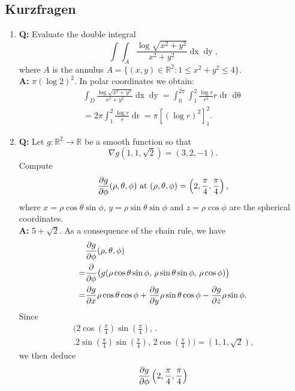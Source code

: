 \documentclass[a4paper,10pt]{article}
\def\R{\mathbb{R}}
\begin{document}
\subsection{Kurzfragen}
\begin{enumerate}
    \item \textbf{Q: } Evaluate the double integral
    \[\int \int_A \frac{\log \sqrt{x^2 + y^2}}{x^2 + y^2} \mathop{dx} \mathop{dy} \text{,}\]
    where $A$ is the annulus $A = \{(x, y) \in \R^2: 1 \le x^2 + y^2 \le 4\}$.\\
    \textbf{A:} $\pi (\log 2)^2$. In polar coordinates we obtain:
    \begin{multline*}
        \int_D \frac{\log \sqrt{x^2 + y^2}}{x^2 + y^2} \mathop{dx} \mathop{dy} = \int_0^{2 \pi} \int_1^2 \frac{\log r}{r^2} r \mathop{dr} \mathop{d \theta}\\
        = 2 \pi \int_1^2 \frac{\log r}{r} \mathop{dr} = \pi \left[(\log r)^2\right]_1^2 \text{.}
    \end{multline*}
    \item \textbf{Q:} Let $g: \R^2 \to \R$ be a smooth function so that
    \[\nabla g(1, 1, \sqrt{2}) = (3, 2, -1) \text{.}\]
    Compute
    \[\pdv{g}{\phi} (\rho, \theta, \phi) \text{ at } (\rho, \theta, \phi) = \left(2, \frac{\pi}{4}, \frac{\pi}{4}\right) \text{,}\]
    where $x = \rho \cos \theta \sin \phi$, $y = \rho \sin \theta \sin \phi$ and $z = \rho \cos \phi$ are the spherical coordinates.\\
    \textbf{A:} $5 + \sqrt{2}$. As a consequence of the chain rule, we have
    \begin{align*}
        &\pdv{g}{\phi} (\rho, \theta, \phi)\\
        = &\pdv{}{\phi} \bigl(g(\rho \cos \theta \sin \phi,\, \rho \sin \theta \sin \phi,\, \rho \cos \phi)\bigr)\\
        = &\pdv{g}{x} \rho \cos \theta \cos \phi + \pdv{g}{y} \rho \sin \theta \cos \phi - \pdv{g}{z} \rho \sin \phi \text{.}
    \end{align*}
    Since
    \begin{multline*}
        \bigl(2 \cos \left(\frac{\pi}{4}\right) \sin \left(\frac{\pi}{4}\right),\,\bigr.\\
        \bigl.2 \sin \left(\frac{\pi}{4}\right) \sin \left(\frac{\pi}{4}\right),\, 2 \cos \left(\frac{\pi}{4}\right)\bigr) = (1, 1, \sqrt{2}) \text{,}
    \end{multline*}
    we then deduce
    \begin{align*}
        &\pdv{g}{\phi} \left(2, \frac{\pi}{4}, \frac{\pi}{4}\right)\\

\end{align*}
\end{enumerate}
\end{document}
